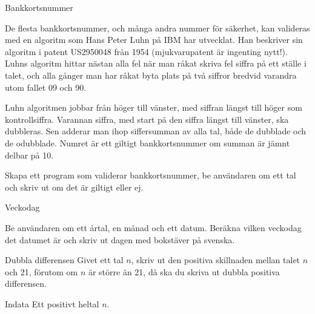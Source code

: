 \documentclass[10pt]{beamer}
\begin{document}
\begin{frame}{Bankkortsnummer}

De flesta bankkortsnummer, och många andra nummer för säkerhet, kan valideras med en algoritm som Hans Peter Luhn på IBM har utvecklat. Han beskriver sin algoritm i patent US2950048 från 1954 (mjukvarupatent är ingenting nytt!). Luhns algoritm hittar nästan alla fel när man råkat skriva fel siffra på ett ställe i talet, och alla gånger man har råkat byta plats på två siffror bredvid varandra utom fallet 09 och 90. 

Luhn algoritmen jobbar från höger till vänster, med siffran längst till höger som kontrollsiffra. Varannan siffra, med start på den siffra längst till vänster, ska dubbleras. Sen adderar man ihop siffersumman av alla tal, både de dubblade och de odubblade. Numret är ett giltigt bankkortsnummer om summan är jämnt delbar på 10. 

Skapa ett program som validerar bankkortsnummer, be användaren om ett tal och skriv ut om det är giltigt eller ej. 

\end{frame}

\begin{frame}{Veckodag}

Be användaren om ett årtal, en månad och ett datum. Beräkna vilken veckodag det datumet är och skriv ut dagen med bokstäver på svenska. 

\end{frame}


\begin{frame}{Dubbla differensen}
Givet ett tal $n$, skriv ut den positiva skillnaden mellan talet $n$ och 21, förutom om $n$ är större än 21, då ska du skriva ut dubbla positiva differensen. 


\begin{exampleblock}{Indata}
Ett positivt heltal $n$.
\end{exampleblock}

\end{frame}
\end{document}

